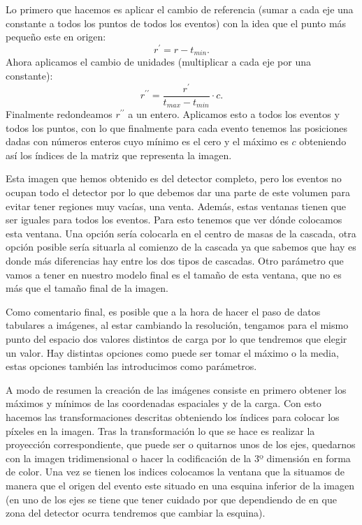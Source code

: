 \documentclass[a4paper,12pt,twoside,titlepage]{article}
\begin{document}
Lo primero que hacemos es aplicar el cambio de referencia (sumar a cada eje una constante a todos los puntos de todos los eventos) con la idea que el punto más pequeño este en origen:
\begin{equation}
  {r}^\prime = {r} - t_{min}.
\end{equation}
Ahora aplicamos el cambio de unidades (multiplicar a cada eje por una constante):
\begin{equation}
  {r}^{\prime\prime} = \frac{{r}^\prime}{t_{max} - t_{min}} \cdot c.
\end{equation}
Finalmente redondeamos $r^{\prime\prime}$ a un entero. Aplicamos esto a todos los eventos y todos los puntos, con lo que finalmente para cada evento tenemos las posiciones dadas con números enteros cuyo mínimo es el cero y el máximo es $c$ obteniendo así los índices de la matriz que representa la imagen.

Esta imagen que hemos obtenido es del detector completo, pero los eventos no ocupan todo el detector por lo que debemos dar una parte de este volumen para evitar tener regiones muy vacías, una venta. Además, estas ventanas tienen que ser iguales para todos los eventos. Para esto tenemos que ver dónde colocamos esta ventana. Una opción sería colocarla en el centro de masas de la cascada, otra opción posible sería situarla al comienzo de la cascada ya que sabemos que hay es donde más diferencias hay entre los dos tipos de cascadas. Otro parámetro que vamos a tener en nuestro modelo final es el tamaño de esta ventana, que no es más que el tamaño final de la imagen.

Como comentario final, es posible que a la hora de hacer el paso de datos tabulares a imágenes, al estar cambiando la resolución, tengamos para el mismo punto del espacio dos valores distintos de carga por lo que tendremos que elegir un valor. Hay distintas opciones como puede ser tomar el máximo o la media, estas opciones también las introducimos como parámetros.

A modo de resumen la creación de las imágenes consiste en primero obtener los máximos y mínimos de las coordenadas espaciales y de la carga. Con esto hacemos las transformaciones descritas obteniendo los índices para colocar los píxeles en la imagen. Tras la transformación lo que se hace es realizar la proyección correspondiente, que puede ser o quitarnos unos de los ejes, quedarnos con la imagen tridimensional o hacer la codificación de la 3º dimensión en forma de color. Una vez se tienen los indices colocamos la ventana que la situamos de manera que el origen del evento este situado en una esquina inferior de la imagen (en uno de los ejes se tiene que tener cuidado por que dependiendo de en que zona del detector ocurra tendremos que cambiar la esquina).
\end{document}
